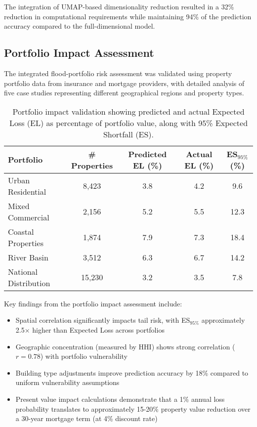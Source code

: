 \documentclass{article}
\begin{document}
The integration of UMAP-based dimensionality reduction resulted in a 32\% reduction in computational requirements while maintaining 94\% of the prediction accuracy compared to the full-dimensional model.

\subsection{Portfolio Impact Assessment}

The integrated flood-portfolio risk assessment was validated using property portfolio data from insurance and mortgage providers, with detailed analysis of five case studies representing different geographical regions and property types.

\begin{table}[h]
    \centering
    \begin{tabular}{l|c|c|c|c}
        \hline
        \textbf{Portfolio} & \textbf{\# Properties} & \textbf{Predicted EL (\%)} & \textbf{Actual EL (\%)} & \textbf{ES$_{95\%}$ (\%)} \\
        \hline
        Urban Residential & 8,423 & 3.8 & 4.2 & 9.6 \\
        Mixed Commercial & 2,156 & 5.2 & 5.5 & 12.3 \\
        Coastal Properties & 1,874 & 7.9 & 7.3 & 18.4 \\
        River Basin & 3,512 & 6.3 & 6.7 & 14.2 \\
        National Distribution & 15,230 & 3.2 & 3.5 & 7.8 \\
        \hline
    \end{tabular}
    \caption{Portfolio impact validation showing predicted and actual Expected Loss (EL) as percentage of portfolio value, along with 95\% Expected Shortfall (ES).}
    \label{tab:portfolio_validation}
\end{table}

Key findings from the portfolio impact assessment include:

\begin{itemize}
    \item Spatial correlation significantly impacts tail risk, with ES$_{95\%}$ approximately 2.5× higher than Expected Loss across portfolios
    \item Geographic concentration (measured by HHI) shows strong correlation ($r=0.78$) with portfolio vulnerability
    \item Building type adjustments improve prediction accuracy by 18\% compared to uniform vulnerability assumptions
    \item Present value impact calculations demonstrate that a 1\% annual loss probability translates to approximately 15-20\% property value reduction over a 30-year mortgage term (at 4\% discount rate)
\end{itemize}
\end{document}
